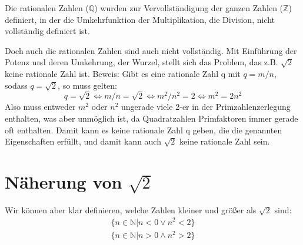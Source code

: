 \documentclass[12pt]{article}
\begin{document}
    Die rationalen Zahlen (\begin{math}\mathbb{Q}\end{math}) wurden zur Vervollständigung der ganzen Zahlen
    (\begin{math}\mathbb{Z}\end{math}) definiert, in der die
    Umkehrfunktion der Multiplikation, die Division, nicht vollständig definiert ist.

    Doch auch die rationalen Zahlen sind auch nicht vollständig.
    Mit Einführung der Potenz und deren Umkehrung, der Wurzel, stellt sich das Problem, das z.B.
    \begin{math}\sqrt{2}\end{math} keine rationale Zahl ist.
    Beweis:
    Gibt es eine rationale Zahl q mit \begin{math}q=m/n\end{math}, sodass \begin{math}q=\sqrt{2}\end{math}, so muss gelten:
    \begin{equation}
        q = \sqrt{2} \Leftrightarrow m/n = \sqrt{2} \Leftrightarrow m^2/n^2=2 \Leftrightarrow m^2 = 2n^2
    \end{equation}
    Also muss entweder \begin{math}m^2\end{math} oder \begin{math}n^2\end{math} ungerade viele 2-er in der
    Primzahlenzerlegung enthalten, was aber unmöglich ist, da Quadratzahlen Primfaktoren immer gerade oft enthalten.
    Damit kann es keine rationale Zahl q geben, die die genannten Eigenschaften erfüllt, und damit kann auch
    \begin{math}\sqrt{2}\end{math} keine rationale Zahl sein.


    \section{Näherung von \begin{math}\sqrt{2}\end{math}}

    Wir können aber klar definieren, welche Zahlen kleiner und größer als \begin{math}\sqrt{2}\end{math} sind:
    \begin{displaymath}\begin{split}
        \{n \in \mathbb{N} | n < 0 \lor n^2 < 2\} \\
        \{n \in \mathbb{N} | n > 0 \land n^2 > 2\}
    \end{split}\end{displaymath}
\end{document}
